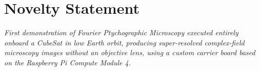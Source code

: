 \section{Novelty Statement}

\emph{First demonstration of Fourier Ptychographic Microscopy executed entirely onboard a CubeSat in low Earth orbit, producing super-resolved complex-field microscopy images without an objective lens, using a custom carrier board based on the Raspberry Pi Compute Module 4.}
